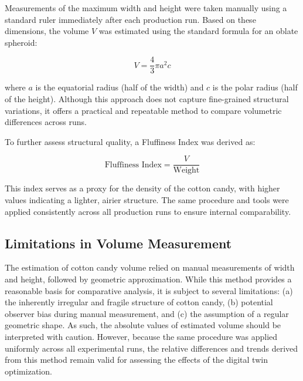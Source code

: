 Measurements of the maximum width and height were taken manually using a standard ruler immediately after each production run. Based on these dimensions, the volume \( V \) was estimated using the standard formula for an oblate spheroid:

\[
V = \frac{4}{3} \pi a^2 c
\]

where \( a \) is the equatorial radius (half of the width) and \( c \) is the polar radius (half of the height). Although this approach does not capture fine-grained structural variations, it offers a practical and repeatable method to compare volumetric differences across runs.

To further assess structural quality, a Fluffiness Index was derived as:

\[
\text{Fluffiness Index} = \frac{V}{\text{Weight}}
\]

This index serves as a proxy for the density of the cotton candy, with higher values indicating a lighter, airier structure. The same procedure and tools were applied consistently across all production runs to ensure internal comparability.

\subsection{Limitations in Volume Measurement}

The estimation of cotton candy volume relied on manual measurements of width and height, followed by geometric approximation. While this method provides a reasonable basis for comparative analysis, it is subject to several limitations: (a) the inherently irregular and fragile structure of cotton candy, (b) potential observer bias during manual measurement, and (c) the assumption of a regular geometric shape. As such, the absolute values of estimated volume should be interpreted with caution. However, because the same procedure was applied uniformly across all experimental runs, the relative differences and trends derived from this method remain valid for assessing the effects of the digital twin optimization.